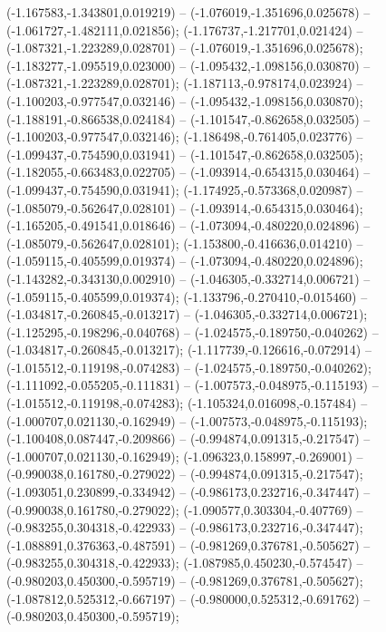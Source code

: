  (-1.167583,-1.343801,0.019219) -- (-1.076019,-1.351696,0.025678) -- (-1.061727,-1.482111,0.021856);
 (-1.176737,-1.217701,0.021424) -- (-1.087321,-1.223289,0.028701) -- (-1.076019,-1.351696,0.025678);
 (-1.183277,-1.095519,0.023000) -- (-1.095432,-1.098156,0.030870) -- (-1.087321,-1.223289,0.028701);
 (-1.187113,-0.978174,0.023924) -- (-1.100203,-0.977547,0.032146) -- (-1.095432,-1.098156,0.030870);
 (-1.188191,-0.866538,0.024184) -- (-1.101547,-0.862658,0.032505) -- (-1.100203,-0.977547,0.032146);
 (-1.186498,-0.761405,0.023776) -- (-1.099437,-0.754590,0.031941) -- (-1.101547,-0.862658,0.032505);
 (-1.182055,-0.663483,0.022705) -- (-1.093914,-0.654315,0.030464) -- (-1.099437,-0.754590,0.031941);
 (-1.174925,-0.573368,0.020987) -- (-1.085079,-0.562647,0.028101) -- (-1.093914,-0.654315,0.030464);
 (-1.165205,-0.491541,0.018646) -- (-1.073094,-0.480220,0.024896) -- (-1.085079,-0.562647,0.028101);
 (-1.153800,-0.416636,0.014210) -- (-1.059115,-0.405599,0.019374) -- (-1.073094,-0.480220,0.024896);
 (-1.143282,-0.343130,0.002910) -- (-1.046305,-0.332714,0.006721) -- (-1.059115,-0.405599,0.019374);
 (-1.133796,-0.270410,-0.015460) -- (-1.034817,-0.260845,-0.013217) -- (-1.046305,-0.332714,0.006721);
 (-1.125295,-0.198296,-0.040768) -- (-1.024575,-0.189750,-0.040262) -- (-1.034817,-0.260845,-0.013217);
 (-1.117739,-0.126616,-0.072914) -- (-1.015512,-0.119198,-0.074283) -- (-1.024575,-0.189750,-0.040262);
 (-1.111092,-0.055205,-0.111831) -- (-1.007573,-0.048975,-0.115193) -- (-1.015512,-0.119198,-0.074283);
 (-1.105324,0.016098,-0.157484) -- (-1.000707,0.021130,-0.162949) -- (-1.007573,-0.048975,-0.115193);
 (-1.100408,0.087447,-0.209866) -- (-0.994874,0.091315,-0.217547) -- (-1.000707,0.021130,-0.162949);
 (-1.096323,0.158997,-0.269001) -- (-0.990038,0.161780,-0.279022) -- (-0.994874,0.091315,-0.217547);
 (-1.093051,0.230899,-0.334942) -- (-0.986173,0.232716,-0.347447) -- (-0.990038,0.161780,-0.279022);
 (-1.090577,0.303304,-0.407769) -- (-0.983255,0.304318,-0.422933) -- (-0.986173,0.232716,-0.347447);
 (-1.088891,0.376363,-0.487591) -- (-0.981269,0.376781,-0.505627) -- (-0.983255,0.304318,-0.422933);
 (-1.087985,0.450230,-0.574547) -- (-0.980203,0.450300,-0.595719) -- (-0.981269,0.376781,-0.505627);
 (-1.087812,0.525312,-0.667197) -- (-0.980000,0.525312,-0.691762) -- (-0.980203,0.450300,-0.595719);
